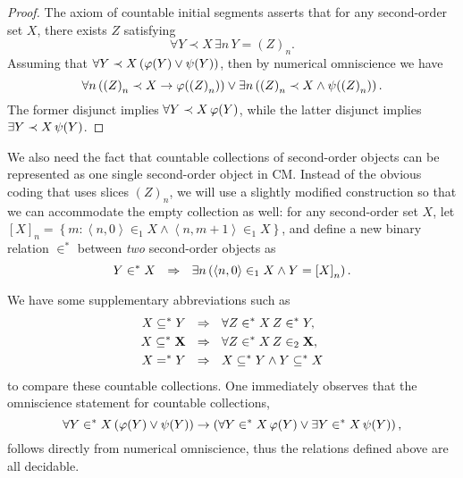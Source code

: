 \documentclass[11pt]{article}
\theoremstyle{plain}
\theoremstyle{definition}
\newcommand{\tuple}[1]{\left\langle #1 \right\rangle}
\begin{document}
\begin{proof}
    The axiom of countable initial segments asserts that for any second-order set $X$, there exists $Z$ satisfying
    \[\forall Y \prec X \, \exists n \, Y = \left(Z\right)_n.\]
    Assuming that $\forall Y \prec X \left(\varphi\mleft(Y\mright) \lor \psi\mleft(Y\mright)\right)$, then by numerical omniscience we have
    \[\forall n \left(\left(Z\right)_n \prec X \rightarrow \varphi\mleft(\left(Z\right)_n\mright)\right) \lor \exists n \left(\left(Z\right)_n \prec X \land \psi\mleft(\left(Z\right)_n\mright)\right).\]
    The former disjunct implies $\forall Y \prec X \, \varphi\mleft(Y\mright)$, while the latter disjunct implies $\exists Y \prec X \, \psi\mleft(Y\mright)$.
\end{proof}

We also need the fact that countable collections of second-order objects can be represented as one single second-order object in $\mathrm{CM}$. Instead of the obvious coding that uses slices $\left(Z\right)_n$, we will use a slightly modified construction so that we can accommodate the empty collection as well: for any second-order set $X$, let $\left[X\right]_n = \left\{m : \tuple{n, 0} \in_1 X \land \tuple{n, m + 1} \in_1 X\right\}$, and define a new binary relation $\in^*$ between \emph{two} second-order objects as
\[Y \in^* X \ \ \ratio\Rightarrow \ \ \exists n \left(\tuple{n, 0} \in_1 X \land Y = \left[X\right]_n\right).\]

We have some supplementary abbreviations such as
\begin{align*}
    X \subseteq^* Y \ \           & \ratio\Rightarrow \ \ \forall Z \in^* X \, Z \in^* Y,          \\
    X \subseteq^* \mathbf{X} \ \  & \ratio\Rightarrow \ \ \forall Z \in^* X \, Z \in_2 \mathbf{X}, \\
    X =^* Y \ \                   & \ratio\Rightarrow \ \ X \subseteq^* Y \land Y \subseteq^* X
\end{align*}
to compare these countable collections. One immediately observes that the omniscience statement for countable collections,
\[\forall Y \in^* X \left(\varphi\mleft(Y\mright) \lor \psi\mleft(Y\mright)\right) \rightarrow \left(\forall Y \in^* X \, \varphi\mleft(Y\mright) \lor \exists Y \in^* X \, \psi\mleft(Y\mright)\right),\]
follows directly from numerical omniscience, thus the relations defined above are all decidable.
\end{document}
